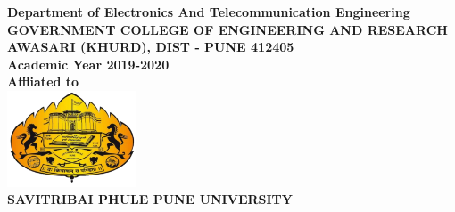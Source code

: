 \begin{center}
\large{\textbf{Department of Electronics And Telecommunication Engineering}}\\
\Large{\textbf{GOVERNMENT COLLEGE OF ENGINEERING AND RESEARCH}}\\
\large{\textbf{AWASARI (KHURD), DIST - PUNE 412405}}
\large{\textbf{\\Academic Year 2019-2020}}\\
\large{\textbf{Affliated to\\}}
\includegraphics[width=1.5in]{project/images/sppu_logo.png}\\
\large{\textbf{SAVITRIBAI PHULE PUNE UNIVERSITY}}
\newpage
\end{center}